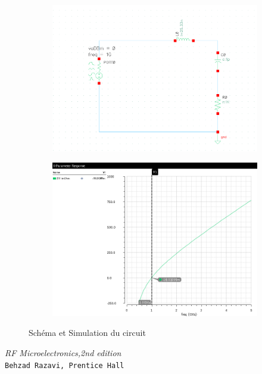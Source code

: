 \documentclass[a4paper]{article}
\begin{document}
\begin{figure}[!htb]
  \begin{subfigure}[t]{.5\linewidth}
      \centering
      \includegraphics[width=1.1\linewidth]{circuit-LRC.png}
      \label{fig:rccircuit}
  \end{subfigure}%
  \begin{subfigure}[t]{.5\linewidth}
    \centering
    \includegraphics[width=1\linewidth]{sim-LRC.png}
    \label{fig:rccircuit-sim}
  \end{subfigure}%
  \caption{Sch\'ema et Simulation du circuit}
  \label{fig:RC-sim}
\end{figure}


\clearpage
{}

\begin{thebibliography}{9}

\textit{RF Microelectronics,2nd edition}\\
\texttt{Behzad Razavi, Prentice Hall}

\end{thebibliography}
\end{document}
